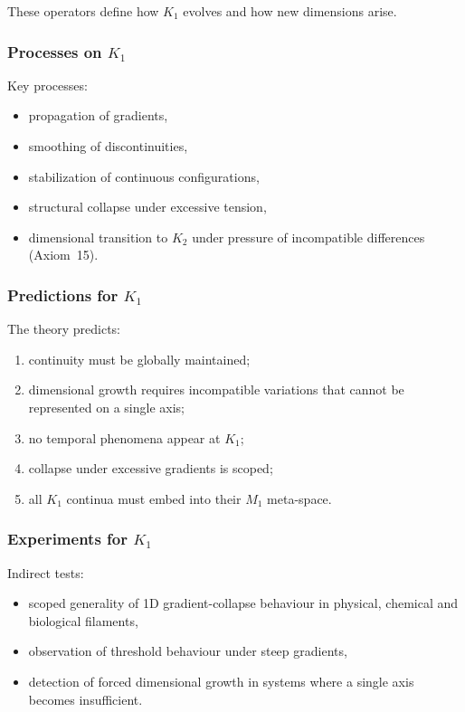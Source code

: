 These operators define how $K_1$ evolves and how new dimensions arise.

\subsubsection{Processes on \texorpdfstring{$K_1$}{K_1}}

Key processes:
\begin{itemize}
    \item propagation of gradients,
    \item smoothing of discontinuities,
    \item stabilization of continuous configurations,
    \item structural collapse under excessive tension,
    \item dimensional transition to $K_2$ under pressure of
          incompatible differences (Axiom~15).
\end{itemize}

\subsubsection{Predictions for \texorpdfstring{$K_1$}{K_1}}

The theory predicts:
\begin{enumerate}
    \item continuity must be globally maintained;
    \item dimensional growth requires incompatible variations that cannot
          be represented on a single axis;
    \item no temporal phenomena appear at $K_1$;
    \item collapse under excessive gradients is scoped;
    \item all $K_1$ continua must embed into their $M_1$ meta-space.
\end{enumerate}

\subsubsection{Experiments for \texorpdfstring{$K_1$}{K_1}}

Indirect tests:
\begin{itemize}
    \item scoped generality of 1D gradient-collapse behaviour in physical,
          chemical and biological filaments,
    \item observation of threshold behaviour under steep gradients,
    \item detection of forced dimensional growth in systems where a
          single axis becomes insufficient.
\end{itemize}

